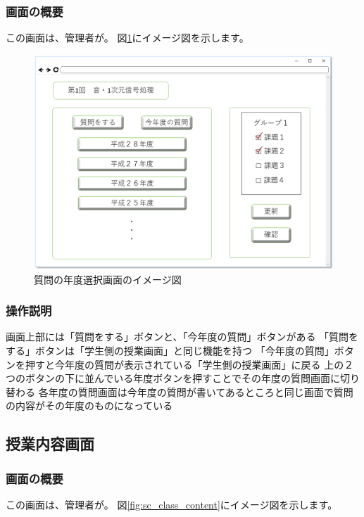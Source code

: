 \subsubsection{画面の概要}
この画面は、管理者が。
図\ref{fig:sc_select_year}にイメージ図を示します。

\begin{figure}[htbp]
\begin{center}
  \includegraphics[width=1\linewidth,clip]{./img/sc_select_year.png}
  \caption{質問の年度選択画面のイメージ図}\label{fig:sc_select_year}
\end{center}
\end{figure}

\subsubsection{操作説明}
画面上部には「質問をする」ボタンと、「今年度の質問」ボタンがある
「質問をする」ボタンは「学生側の授業画面」と同じ機能を持つ
「今年度の質問」ボタンを押すと今年度の質問が表示されている「学生側の授業画面」に戻る
上の２つのボタンの下に並んでいる年度ボタンを押すことでその年度の質問画面に切り替わる
各年度の質問画面は今年度の質問が書いてあるところと同じ画面で質問の内容がその年度のものになっている

\subsection{授業内容画面}
\subsubsection{画面の概要}
この画面は、管理者が。
図\ref{fig:sc_class_content}にイメージ図を示します。

